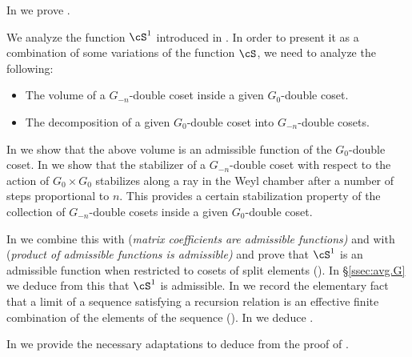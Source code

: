 \documentclass[12pt,a4paper]{amsart}%
\newcommand{\RamiA}[1]{{{#1}}}
\newcommand{\claude}[1]{{{#1}}}
\newcommand{\RamiD}[1]{{{#1}}}
\newcommand{\EitanD}[1]{{{#1}}}
\newcommand{\EitanC}[1]{{{#1}}}
\begin{document}
In  we prove . 
\EitanC{We analyze the function $\cS^1$ introduced in \Cref{sub:idea}. In order to present it as a combination of \RamiA{some variations of the} function $\cS$, we need to analyze the following:
\begin{itemize}
    \item The volume of a $G_{-n}$-double coset inside a given  $G_0$-double coset.
    \item \RamiD{The decomposition of a given $G_0$-double coset into} $G_{-n}$-double cosets.
\end{itemize}

 In  \Cref{ssec:vol} we show  that the above volume is an admissible function of the $G_0$-double coset.
  In \Cref{ssec:stab} we show that the stabilizer of a $G_{-n}$-double coset \EitanD{with respect to} the action of $G_{0}\times G_{0}$
stabilizes along a ray in the Weyl chamber  after a number of
steps proportional to $n$. This provides \RamiD{a certain stabilization property} of the collection of $G_{-n}$-double cosets inside a given $G_0$-double coset.
}
In
 we combine this with  \EitanD{(\it{matrix coefficients are admissible functions})} and with  \EitanD{(\it{product of admissible functions is admissible})} and
prove that $\cS^1$ is an admissible function when restricted to cosets of split elements (). In \S \ref{ssec:avg.G} we deduce from this that $\cS^1$ is admissible.
In  we record the
elementary fact that a limit of a sequence satisfying a recursion relation is an effective
finite combination of the elements of the sequence (). In
 we deduce .

In  we \EitanD{provide the necessary \claude{adaptations} to deduce \Cref{thm:KY} from the proof of \cite[Proposition~1.10]{KYtempered}. }
\end{document}
